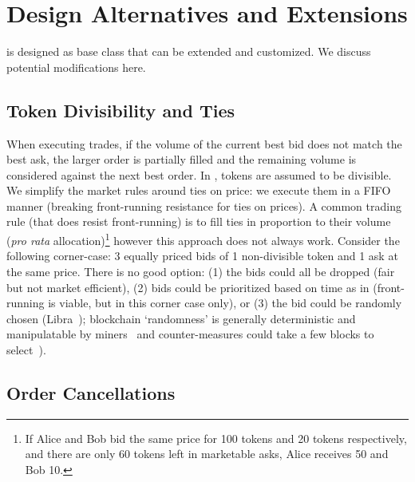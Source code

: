 
\section{Design Alternatives and Extensions}


\cm is designed as base class that can be extended and customized. We discuss potential modifications here.  

\subsection{Token Divisibility and Ties} 

When executing trades, if the volume of the current best bid does not match the best ask, the larger order is partially filled and the remaining volume is considered against the next best order. In \cm, tokens are assumed to be divisible. We simplify the market rules around ties on price: we execute them in a FIFO manner (breaking front-running resistance for ties on prices). A common trading rule (that does resist front-running) is to fill ties in proportion to their volume (\ie \textit{pro rata} allocation)\footnote{If Alice and Bob bid the same price for 100 tokens and 20 tokens respectively, and there are only 60 tokens left in marketable asks, Alice receives 50 and Bob 10.} however this approach does not always work. Consider the following corner-case: 3 equally priced bids of 1 non-divisible token and 1 ask at the same price. There is no good option: (1) the bids could all be dropped (fair but not market efficient), (2) bids could be prioritized based on time as in \cm (front-running is viable, but in this corner case only), or (3) the bid could be randomly chosen (\cf Libra~\cite{mavroudis2019libra}); blockchain `randomness' is generally deterministic and manipulatable by miners~\cite{bonneau2015random,buenz2017proofs} and counter-measures could take a few blocks to select~\cite{boneh2018verifiable}).

\subsection{Order Cancellations}

